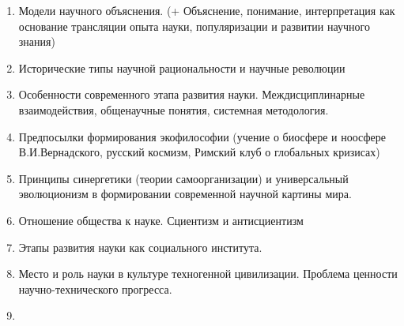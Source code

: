 \documentclass[main.tex]{subfiles}
\begin{document}
\begin{enumerate}
	\item Модели научного объяснения. (+ Объяснение, понимание, интерпретация как основание трансляции опыта науки, популяризации и развитии научного знания)
	\item Исторические типы научной рациональности и научные революции
	\item Особенности современного этапа развития науки. Междисциплинарные взаимодействия, общенаучные понятия, системная методология.
	\item Предпосылки формирования экофилософии (учение о биосфере и ноосфере В.И.Вернадского, русский космизм, Римский клуб о глобальных кризисах)
	\item Принципы синергетики (теории самоорганизации) и универсальный эволюционизм в формировании современной научной картины мира.
	\item Отношение общества к науке. Сциентизм и антисциентизм
	\item Этапы развития науки как социального института.
	\item Место и роль науки в культуре техногенной цивилизации. Проблема ценности научно-технического прогресса.
	\item 
\end{enumerate}
\end{document}
